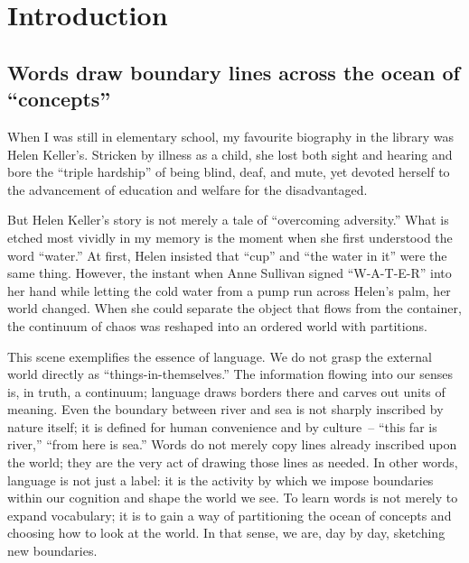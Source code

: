 \documentclass[12pt,twoside]{report}
\begin{document}
\clearpage{\pagestyle{empty}\cleardoublepage}
\setcounter{page}{1}
\fancyhead[LE,RO]{\slshape \rightmark}
\fancyhead[LO,RE]{\slshape \leftmark}

\chapter{Introduction}
\section{Words draw boundary lines across the ocean of ``concepts''}
When I was still in elementary school, my favourite biography in the library was Helen Keller’s. Stricken by illness as a child, she lost both sight and hearing and bore the ``triple hardship'' of being blind, deaf, and mute, yet devoted herself to the advancement of education and welfare for the disadvantaged.

But Helen Keller’s story is not merely a tale of ``overcoming adversity.'' What is etched most vividly in my memory is the moment when she first understood the word ``water.'' At first, Helen insisted that ``cup'' and ``the water in it'' were the same thing. However, the instant when Anne Sullivan signed ``W-A-T-E-R'' into her hand while letting the cold water from a pump run across Helen’s palm, her world changed. When she could separate the object that flows from the container, the continuum of chaos was reshaped into an ordered world with partitions.

This scene exemplifies the essence of language. We do not grasp the external world directly as ``things-in-themselves.'' The information flowing into our senses is, in truth, a continuum; language draws borders there and carves out units of meaning. Even the boundary between river and sea is not sharply inscribed by nature itself; it is defined for human convenience and by culture~-- ``this far is river,'' ``from here is sea.'' Words do not merely copy lines already inscribed upon the world; they are the very act of drawing those lines as needed. In other words, language is not just a label: it is the activity by which we impose boundaries within our cognition and shape the world we see. To learn words is not merely to expand vocabulary; it is to gain a way of partitioning the ocean of concepts and choosing how to look at the world. In that sense, we are, day by day, sketching new boundaries.
\end{document}
